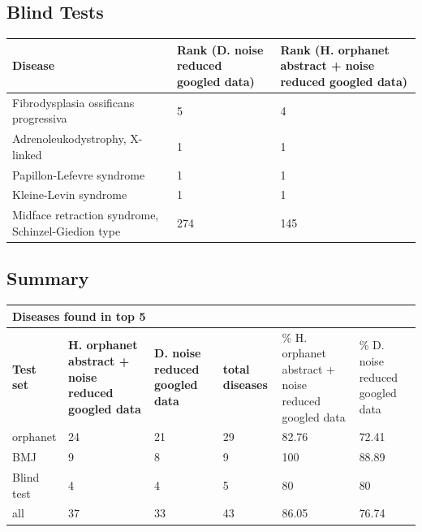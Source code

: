 \documentclass[10pt,letterpaper,two column,final]{article}
\begin{document}
\subsection{Blind Tests}
\label{app:blind_with_without}
\begin{center}
\begin{small}
	\begin{tabular}{|p{6cm}|p{2.5cm}|p{2.5cm}|}
	\hline
	\textbf{Disease}  & \textbf{Rank (D. noise reduced googled data)} & \textbf{Rank (H. orphanet abstract + noise reduced googled data)} \\
	\hline\hline
Fibrodysplasia ossificans progressiva   &  5 & 4 \\ \hline
Adrenoleukodystrophy, X-linked          &  1 & 1 \\ \hline
Papillon-Lefevre syndrome               &  1 & 1 \\ \hline
Kleine-Levin syndrome                   &  1 & 1 \\ \hline
Midface retraction syndrome, Schinzel-Giedion type  & 274  & 145 \\ \hline
	\end{tabular}
\end{small}
\end{center}


\subsection{Summary}
\label{app:summary_with_without}

\begin{center}
\begin{small}
\begin{tabular}{l|p{2.2cm}p{2.2cm}||p{1.2cm}p{2.2cm}p{2.2cm}}
	\multicolumn{6}{l}{\textbf{Diseases found in top 5}} \\ \hline
\textbf{Test set} & \textbf{H. orphanet abstract + noise reduced googled data} &	\textbf{D. noise reduced googled data}	 &	\textbf{total diseases} &	\% H. orphanet abstract + noise reduced googled data &\% D. noise reduced googled data \\ \hline
orphanet    &   24    &  21    &  29     & 82.76     & 72.41 \\
BMJ	        &    9   &   8   &     9  &    100  & 88.89 \\
Blind test	&    4   &   4   &     5  &    80  & 80 \\ \hline \hline
all	        &    37   & 33     &   43    &  86.05    & 76.74 \\ \hline
\end{tabular}
\end{small}
\end{center}
\end{document}

